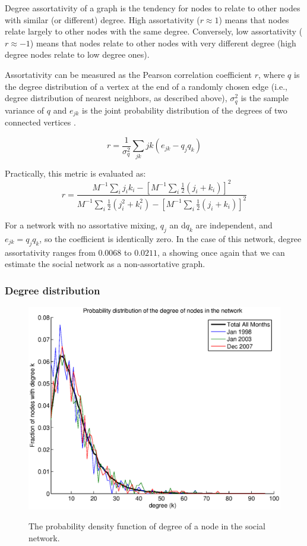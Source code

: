 \documentclass[12pt]{article}
\begin{document}
Degree assortativity of a graph is the tendency for nodes to relate to other nodes with similar (or different) degree. High assortativity (\(r \approx 1\)) means that nodes relate largely to other nodes with the same degree. Conversely, low assortativity (\(r \approx -1\)) means that nodes relate to other nodes with very different degree (high degree nodes relate to low degree ones). 

Assortativity can be measured as the Pearson correlation coefficient \(r\), where \(q\) is the degree distribution of a vertex at the end of a randomly chosen edge (i.e., degree distribution of nearest neighbors, as described above), \(\sigma^2_q\) is the sample variance of \(q\) and \(e_{jk}\) is the joint probability distribution of the degrees of two connected vertices \cite{2}.

\begin{equation}
r = \frac{1}{\sigma^2_q} \sum_{jk} jk(e_{jk} - q_{j}q_{k})
\label{eq:rk}
\end{equation}

 Practically, this metric is evaluated as:
\begin{equation}
r = \frac{M^{-1} \sum_i j_i k_i - [M^{-1} \sum_i \frac{1}{2} (j_i + k_i)]^2}{M^{-1} \sum_i\frac{1}{2} (j_i^2 + k_i^2) - [M^{-1} \sum_i \frac{1}{2} (j_i + k_i)]^2}
\end{equation}

For a network with no assortative mixing, \(q_j\) an d\(q_k\) are independent, and \(e_{jk} = q_{j}q_{k}\), so the coefficient is identically zero. In the case of this network, degree assortativity ranges from \( 0.0068 \) to \(0.0211\), a showing once again that we can estimate the social network as a non-assortative graph.

\subsubsection*{Degree distribution}

\begin{figure}[H]
\includegraphics[trim = 0cm 0cm 0cm 0cm, width = .9\textwidth]{Graficos/ProbDistk.eps}
\label{fig:ProbDistk}
\caption{The probability density function of degree of a node in the social network.}
\label{fig:Pk}
\end{figure}
\end{document}
